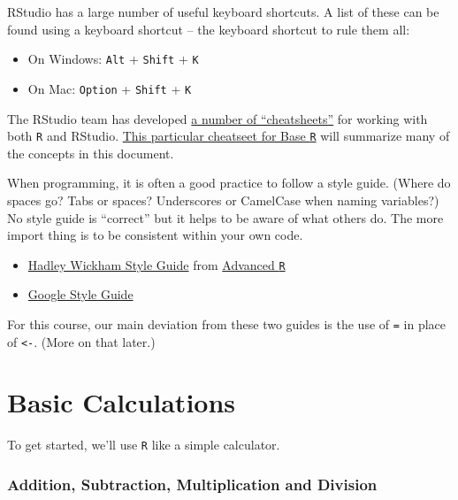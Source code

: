 \documentclass[]{book}
\providecommand{\tightlist}{%
  \setlength{\itemsep}{0pt}\setlength{\parskip}{0pt}}
\theoremstyle{definition}
\theoremstyle{definition}
\theoremstyle{definition}
\theoremstyle{remark}
\begin{document}
RStudio has a large number of useful keyboard shortcuts. A list of these
can be found using a keyboard shortcut -- the keyboard shortcut to rule
them all:

\begin{itemize}
\tightlist
\item
  On Windows: \texttt{Alt} + \texttt{Shift} + \texttt{K}
\item
  On Mac: \texttt{Option} + \texttt{Shift} + \texttt{K}
\end{itemize}

The RStudio team has developed
\href{https://www.rstudio.com/resources/cheatsheets/}{a number of
``cheatsheets''} for working with both \texttt{R} and RStudio.
\href{http://www.rstudio.com/wp-content/uploads/2016/05/base-r.pdf}{This
particular cheatseet for Base \texttt{R}} will summarize many of the
concepts in this document.

When programming, it is often a good practice to follow a style guide.
(Where do spaces go? Tabs or spaces? Underscores or CamelCase when
naming variables?) No style guide is ``correct'' but it helps to be
aware of what others do. The more import thing is to be consistent
within your own code.

\begin{itemize}
\tightlist
\item
  \href{http://adv-r.had.co.nz/Style.html}{Hadley Wickham Style Guide}
  from \href{http://adv-r.had.co.nz/}{Advanced \texttt{R}}
\item
  \href{https://google.github.io/styleguide/Rguide.xml}{Google Style
  Guide}
\end{itemize}

For this course, our main deviation from these two guides is the use of
\texttt{=} in place of \texttt{\textless{}-}. (More on that later.)

\section{Basic Calculations}\label{basic-calculations}

To get started, we'll use \texttt{R} like a simple calculator.

\subsubsection*{Addition, Subtraction, Multiplication and
Division}\label{addition-subtraction-multiplication-and-division}
\end{document}
